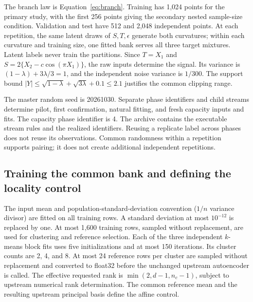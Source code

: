 The branch law is Equation~\eqref{eq:branch}. Training has 1,024 points
for the primary study, with the first 256 points giving the secondary
nested sample-size condition. Validation and test have 512 and 2,048
independent points. At each repetition, the same latent draws of
$S,T,\epsilon$ generate both curvatures; within each curvature and
training size, one fitted bank serves all three target mixtures.
Latent labels never train the partitions. Since $T=X_1$ and
$S=2\{X_2-c\cos(\pi X_1)\}$, the raw inputs determine the signal.
Its variance is $(1-\lambda)+3\lambda/3=1$, and the independent
noise variance is $1/300$. The support bound
$|Y|\leq\sqrt{1-\lambda}+\sqrt{3\lambda}+0.1\leq2.1$
justifies the common clipping range.

The master random seed is 20261030. Separate phase identifiers and
child streams determine pilot, first confirmation, natural fitting,
and fresh capacity inputs and fits. The capacity phase identifier is
4. The archive contains the executable stream rules and the realized
identifiers. Reusing a replicate label across phases does not reuse its
observations. Common randomness within a repetition supports pairing;
it does not create additional independent repetitions.

\subsection{Training the common bank and defining the locality control}

The input mean and population-standard-deviation convention
($1/n$ variance divisor) are fitted on all training rows. A standard
deviation at most $10^{-12}$ is replaced by one. At most 1,600 training
rows, sampled without replacement, are used for clustering and
reference selection. Each of the three independent $k$-means block
fits uses five initializations and at most 150 iterations. Its
cluster counts are 2, 4, and 8. At most 24 reference rows per cluster
are sampled without replacement and converted to float32 before
the unchanged upstream autoencoder is called. The effective requested
rank is $\min(2,d-1,n_c-1)$, subject to upstream numerical rank
determination. The common reference mean and the resulting upstream
principal basis define the affine control.

